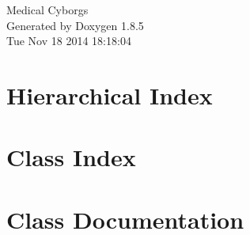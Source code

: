 \documentclass[twoside]{book}
\newcommand{\clearemptydoublepage}{%
  \newpage{\pagestyle{empty}\cleardoublepage}%
}
\begin{document}
\hypersetup{pageanchor=false}
\begin{titlepage}
\vspace*{7cm}
\begin{center}%
{\Large Medical Cyborgs }\\
\vspace*{1cm}
{\large Generated by Doxygen 1.8.5}\\
\vspace*{0.5cm}
{\small Tue Nov 18 2014 18:18:04}\\
\end{center}
\end{titlepage}
\clearemptydoublepage
\tableofcontents
\clearemptydoublepage
{}
\hypersetup{pageanchor=true}

\chapter{Hierarchical Index}

\chapter{Class Index}

\chapter{Class Documentation}
































\newpage
{}
{}
\printindex
\end{document}
